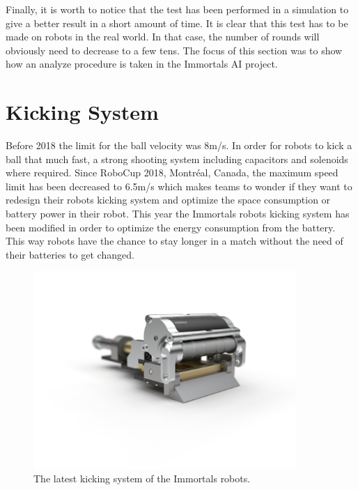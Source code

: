 \documentclass[runningheads]{llncs}
\begin{document}
Finally, it is worth to notice that the test has been performed in a simulation to give a better result in a short amount of time. It is clear that this test has to be made on robots in the real world. In that case, the number of rounds will obviously need to decrease to a few tens. The focus of this section was to show how an analyze procedure is taken in the Immortals AI project.

%

\section{Kicking System}
Before 2018 the limit for the ball velocity was 8m/s. In order for robots to kick a ball that much fast, a strong shooting system including capacitors and solenoids where required. Since RoboCup 2018, Montréal, Canada, the maximum speed limit has been decreased to 6.5m/s which makes teams to wonder if they want to redesign their robots kicking system and optimize the space consumption or battery power in their robot. This year the Immortals robots kicking system has been modified in order to optimize the energy consumption from the battery. This way robots have the chance to stay longer in a match without the need of their batteries to get changed.

\begin{figure}
\centering
\includegraphics[width=10cm]{images/kicking_system.jpg}
\caption{The latest kicking system of the Immortals robots.} \label{fig_Kick_Sys}
\end{figure}
\end{document}
